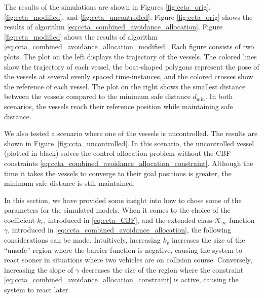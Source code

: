 The results of the simulations are shown in Figures \ref{fig:ccta_orig}, \ref{fig:ccta_modified}, and \ref{fig:ccta_uncontrolled}.
Figure \ref{fig:ccta_orig} shows the results of algorithm \eqref{eq:ccta_combined_avoidance_allocation}.
Figure \ref{fig:ccta_modified} shows the results of algorithm \eqref{eq:ccta_combined_avoidance_allocation_modified}.
Each figure consists of two plots.
The plot on the left displays the trajectory of the vessels.
The colored lines show the trajectory of each vessel, the boat-shaped polygons represent the pose of the vessels at several evenly spaced time-instances, and the colored crosses show the reference of each vessel.
The plot on the right shows the smallest distance between the vessels compared to the minimum safe distance $d_{\min}$.
In both scenarios, the vessels reach their reference position while maintaining safe distance.

We also tested a scenario where one of the vessels is uncontrolled.
The results are shown in Figure~\ref{fig:ccta_uncontrolled}.
In this scenario, the uncontrolled vessel (plotted in black) solves the control allocation problem without the CBF constraints \eqref{eq:ccta_combined_avoidance_allocation_constraint}.
Although the time it takes the vessels to converge to their goal positions is greater, the minimum safe distance is still maintained.

In this section, we have provided some insight into how to chose some of the parameters for the simulated models.
When it comes to the choice of the coefficient $k_v$, introduced in \eqref{eq:ccta_CBF}, and the extended class-$\mathcal{K}_{\infty}$ function $\gamma$, introduced in \eqref{eq:ccta_combined_avoidance_allocation}, the following considerations can be made.
Intuitively, increasing $k_v$ increases the size of the ``unsafe'' region where the barrier function is negative, causing the system to react sooner in situations where two vehicles are on collision course.
Conversely, increasing the slope of $\gamma$ decreases the size of the region where the constraint \eqref{eq:ccta_combined_avoidance_allocation_constraint} is active, causing the system to react later.

